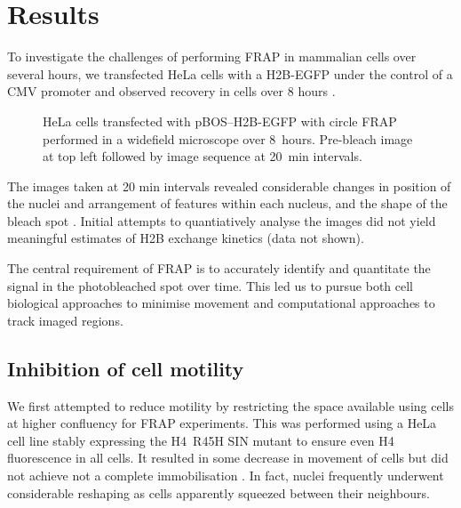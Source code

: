 \section{Results}

    To investigate the challenges of performing FRAP in mammalian cells over several hours,
    we transfected HeLa cells with a H2B-EGFP under the control of a CMV promoter
    and observed recovery in cells over 8 hours .
    
    \begin{figure}
      \centering
         {HeLa cells transfected with pBOS--H2B-EGFP
         with circle FRAP performed in a widefield microscope over 8~hours.
         Pre-bleach image at top left followed by image sequence at 20~min intervals.}
      \label{fig:kill-frap:cell-movement}
    \end{figure}

    The images taken at 20 min intervals revealed considerable changes
    in position of the nuclei and arrangement of features within each nucleus, 
    and the shape of the bleach spot .
    Initial attempts to quantiatively analyse the images
    did not yield meaningful estimates of H2B exchange kinetics (data not shown).

    The central requirement of FRAP is to accurately identify and 
    quantitate the signal in the photobleached spot over time.
    This led us to pursue both cell biological approaches to minimise movement 
    and computational approaches to track imaged regions.


  \subsection{Inhibition of cell motility}

    We first attempted to reduce motility by restricting the space available
    using cells at higher confluency for FRAP experiments.
    This was performed using a HeLa cell line stably expressing 
    the H4~R45H SIN mutant to ensure even H4 fluorescence in all cells.
    It resulted in some decrease in movement of cells
    but did not achieve not a complete immobilisation .
    In fact, nuclei frequently underwent considerable reshaping as cells 
    apparently squeezed between their neighbours.

